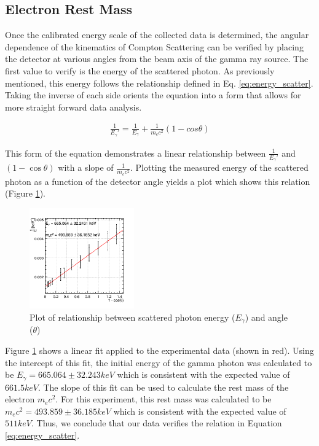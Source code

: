 \documentclass[%
 reprint,
 amsmath,amssymb,
 aps,
 pra,
]{revtex4-1}
\begin{document}
\subsection{Electron Rest Mass}

Once the calibrated energy scale of the collected data is determined, the angular dependence of the kinematics of Compton Scattering can be verified by placing the detector at various angles from the beam axis of the gamma ray source. The first value to verify is the energy of the scattered photon. As previously mentioned, this energy follows the relationship defined in Eq. \ref{eq:energy_scatter}. Taking the inverse of each side orients the equation into a form that allows for more straight forward data analysis.

\begin{gather*}\label{eq:energy_scatter2}
	\frac{1}{E_\gamma '} = \frac{1}{E_\gamma} + \frac{1}{m_{e}c^{2}}(1 - cos\theta)
\end{gather*}

This form of the equation demonstrates a linear relationship between $\frac{1}{E_\gamma '}$ and $(1 - \cos\theta)$ with a slope of $\frac{1}{m_{e}c^{2}}$. Plotting the measured energy of the scattered photon as a function of the detector angle yields a plot which shows this relation (Figure \ref{Fig:EScatFit}).

\begin{figure}[H]
\centering	
	\includegraphics[width=0.4\textwidth]{EScatvTheta.png}
	\caption{Plot of relationship between scattered photon energy ($E_\gamma$) and angle ($\theta$)}
	\label{Fig:EScatFit}
\end{figure}

Figure \ref{Fig:EScatFit} shows a linear fit applied to the experimental data (shown in red). Using the intercept of this fit, the initial energy of the gamma photon was calculated to be $E_\gamma = 665.064 \pm 32.243 keV$ which is consistent with the expected value of $661.5keV$. The slope of this fit can be used to calculate the rest mass of the electron $m_{e}c^{2}$. For this experiment, this rest mass was calculated to be $m_{e}c^{2} = 493.859 \pm 36.185 keV$ which is consistent with the expected value of $511 keV$. Thus, we conclude that our data verifies the relation in Equation \ref{eq:energy_scatter}.
\end{document}
